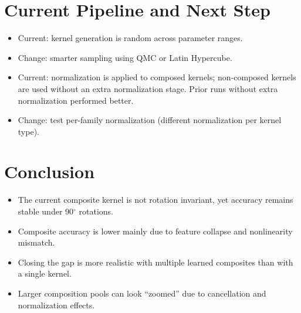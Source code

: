 \documentclass{article}
\begin{document}
\section*{Current Pipeline and Next Step}
\begin{itemize}
    \item Current: kernel generation is random across parameter ranges.
    \item Change: smarter sampling using QMC or Latin Hypercube.
    \item Current: normalization is applied to composed kernels; non-composed kernels are used without an extra normalization stage. Prior runs without extra normalization performed better.
    \item Change: test per-family normalization (different normalization per kernel type).
\end{itemize}

\section*{Conclusion}
\begin{itemize}
    \item The current composite kernel is not rotation invariant, yet accuracy remains stable under 90$^\circ$ rotations.
    \item Composite accuracy is lower mainly due to feature collapse and nonlinearity mismatch.
    \item Closing the gap is more realistic with multiple learned composites than with a single kernel.
    \item Larger composition pools can look ``zoomed'' due to cancellation and normalization effects.
\end{itemize}
\end{document}
